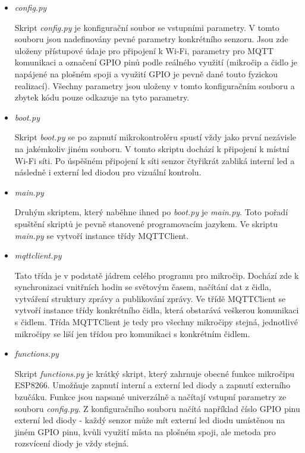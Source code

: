 \begin{itemize}
  \item \textit{config.py} 
  
Skript \textit{config.py} je konfigurační soubor se vstupními parametry. V tomto souboru jsou nadefinovány pevné parametry konkrétního senzoru. Jsou zde uloženy přístupové údaje pro připojení k Wi-Fi, parametry pro MQTT komunikaci a označení GPIO pinů podle reálného využití (mikročip a čidlo je napájené na plošném spoji a využití GPIO je pevně dané touto fyzickou realizací). Všechny parametry jsou uloženy v tomto konfiguračním souboru a zbytek kódu pouze odkazuje na tyto parametry.  
  
  \item \textit{boot.py}
  
Skript \textit{boot.py} se po zapnutí mikrokontroléru spustí vždy jako první nezávisle na jakémkoliv jiném souboru. V tomto skriptu dochází k připojení k místní Wi-Fi síti. Po úspěšném připojení k síti senzor čtyřikrát zabliká interní led a následně i externí led diodou pro vizuální kontrolu.  
  
  \item \textit{main.py}
 
Druhým skriptem, který naběhne ihned po \textit{boot.py} je \textit{main.py}. Toto pořadí spuštění skriptů je pevně stanovené programovacím jazykem. Ve skriptu \textit{main.py} se vytvoří instance třídy MQTTClient. 
  
  \item \textit{mqttclient.py}
  
Tato třída je v podstatě jádrem celého programu pro mikročip. Dochází zde k synchronizaci vnitřních hodin se světovým časem, načítání dat z čidla, vytváření struktury zprávy a publikování zprávy. Ve třídě MQTTClient se vytvoří instance třídy konkrétního čidla, která obstarává veškerou komunikaci s čidlem. Třída MQTTClient je tedy pro všechny mikročipy stejná, jednotlivé mikročipy se liší jen třídou pro komunikaci s konkrétním čidlem.   
  
  \item \textit{functions.py}
  
Skript \textit{functions.py} je krátký skript, který zahrnuje obecné funkce mikročipu ESP8266. Umožňuje zapnutí interní a externí led diody a zapnutí externího bzučáku. Funkce jsou napsané univerzálně a načítají vstupní parametry ze souboru \textit{config.py}. Z konfiguračního souboru načítá například číslo GPIO pinu externí led diody - každý senzor může mít externí led diodu umístěnou na jiném GPIO pinu, kvůli využití místa na plošném spoji, ale metoda pro rozsvícení diody je vždy stejná.  
\end{itemize} 
 
